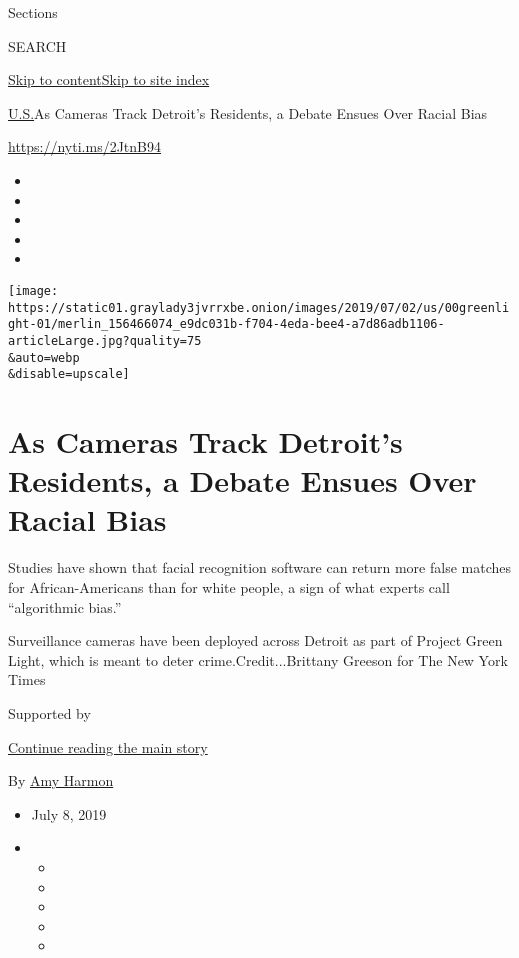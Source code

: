 Sections

SEARCH

\protect\hyperlink{site-content}{Skip to
content}\protect\hyperlink{site-index}{Skip to site index}

\href{/section/us}{U.S.}\textbar{}As Cameras Track Detroit's Residents,
a Debate Ensues Over Racial Bias

\url{https://nyti.ms/2JtnB94}

\begin{itemize}
\item
\item
\item
\item
\item
\end{itemize}

\texttt{[image: https://static01.graylady3jvrrxbe.onion/images/2019/07/02/us/00greenlight-01/merlin\_156466074\_e9dc031b-f704-4eda-bee4-a7d86adb1106-articleLarge.jpg?quality=75\\\&auto=webp\\\&disable=upscale]}

\hypertarget{as-cameras-track-detroits-residents-a-debate-ensues-over-racial-bias}{%
\section{As Cameras Track Detroit's Residents, a Debate Ensues Over
Racial
Bias}\label{as-cameras-track-detroits-residents-a-debate-ensues-over-racial-bias}}

Studies have shown that facial recognition software can return more
false matches for African-Americans than for white people, a sign of
what experts call ``algorithmic bias.''

Surveillance cameras have been deployed across Detroit as part of
Project Green Light, which is meant to deter crime.Credit...Brittany
Greeson for The New York Times

Supported by

\protect\hyperlink{after-sponsor}{Continue reading the main story}

By \href{https://www.nytimes3xbfgragh.onion/by/amy-harmon}{Amy Harmon}

\begin{itemize}
\item
  July 8, 2019
\item
  \begin{itemize}
  \item
  \item
  \item
  \item
  \item
  \end{itemize}
\end{itemize}

